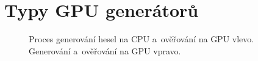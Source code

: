 \chapter{Typy GPU generátorů}
\label{CPUGPU}
\begin{figure}[ht]
    \begin{center}
    \end{center}
    \caption{Proces generování hesel na CPU a~ověřování na GPU vlevo. Generování a~ověřování na
	GPU vpravo. \cite{Schmied}}
\end{figure}

